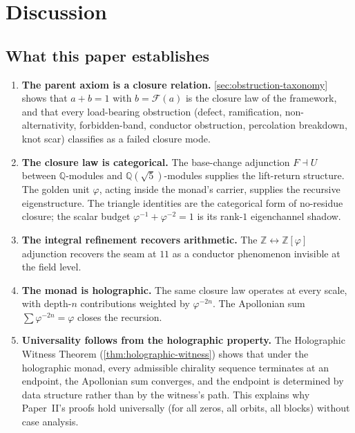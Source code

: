 \documentclass[11pt,a4paper]{article}
\theoremstyle{plain}
\theoremstyle{definition}
\theoremstyle{remark}
\numberwithin{equation}{section}
\providecommand{\Z}{\mathbb{Z}}
\providecommand{\Q}{\mathbb{Q}}
\providecommand{\vp}{\varphi}
\begin{document}
\section{Discussion}
\label{sec:discussion}

\subsection*{What this paper establishes}

\begin{enumerate}[label=(\arabic*), leftmargin=2em]
  \item \textbf{The parent axiom is a closure relation.}
    \cref{sec:obstruction-taxonomy} shows that $a + b = 1$ with
    $b = \mathcal{F}(a)$ is the closure law of the framework, and
    that every load-bearing obstruction (defect, ramification,
    non-alternativity, forbidden-band, conductor obstruction,
    percolation breakdown, knot scar) classifies as a failed
    closure mode.

  \item \textbf{The closure law is categorical.}  The base-change
    adjunction $F \dashv U$ between $\Q$-modules and
    $\Q(\sqrt{5})$-modules supplies the lift-return structure.
    The golden unit $\vp$, acting inside the monad's carrier,
    supplies the recursive eigenstructure.  The triangle
    identities are the categorical form of no-residue closure;
    the scalar budget $\vp^{-1} + \vp^{-2} = 1$ is its
    rank-$1$ eigenchannel shadow.

  \item \textbf{The integral refinement recovers arithmetic.}
    The $\Z \leftrightarrow \Z[\vp]$ adjunction recovers the seam
    at $11$ as a conductor phenomenon invisible at the field
    level.

  \item \textbf{The monad is holographic.}  The same closure law
    operates at every scale, with depth-$n$ contributions
    weighted by $\vp^{-2n}$.  The Apollonian sum $\sum
    \vp^{-2n} = \vp$ closes the recursion.

  \item \textbf{Universality follows from the holographic
    property.}  The Holographic Witness Theorem
    (\cref{thm:holographic-witness}) shows that under the
    holographic monad, every admissible chirality sequence
    terminates at an endpoint, the Apollonian sum converges, and
    the endpoint is determined by data structure rather than by
    the witness's path.  This explains why Paper~II's proofs
    hold universally (for all zeros, all orbits, all blocks)
    without case analysis.


\end{enumerate}
\end{document}
